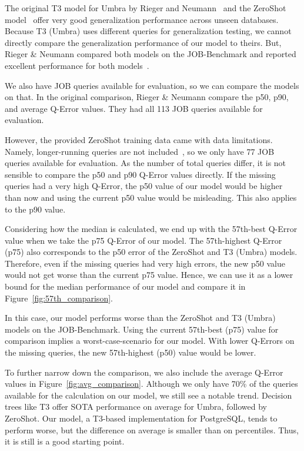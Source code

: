 The original T3 model for Umbra by Rieger and Neumann~\parencite{t3} and the ZeroShot model~\parencite{zeroshot} offer very good generalization performance across unseen databases.
Because T3 (Umbra) uses different queries for generalization testing, we cannot directly compare the generalization performance of our model to theirs.
But, Rieger \& Neumann compared both models on the JOB-Benchmark and reported excellent performance for both models~\parencite{t3}.

We also have JOB queries available for evaluation, so we can compare the models on that.
In the original comparison, Rieger \& Neumann compare the p50, p90, and average Q-Error values.
They had all 113 JOB queries available for evaluation. 

However, the provided ZeroShot training data came with data limitations.
Namely, longer-running queries are not included~\parencite{zeroshot}, so we only have 77 JOB queries available for evaluation.
As the number of total queries differ, it is not sensible to compare the p50 and p90 Q-Error values directly.
If the missing queries had a very high Q-Error, the p50 value of our model would be higher than now and using the current p50 value would be misleading.
This also applies to the p90 value.

Considering how the median is calculated, we end up with the 57th-best Q-Error value when we take the p75 Q-Error of our model.
The 57th-highest Q-Error (p75) also corresponds to the p50 error of the ZeroShot and T3 (Umbra) models.
Therefore, even if the missing queries had very high errors, the new p50 value would not get worse than the current p75 value.
Hence, we can use it as a lower bound for the median performance of our model and compare it in Figure~\ref{fig:57th_comparison}.

In this case, our model performs worse than the ZeroShot and T3 (Umbra) models on the JOB-Benchmark.
Using the current 57th-best (p75) value for comparison implies a worst-case-scenario for our model.
With lower Q-Errors on the missing queries, the new 57th-highest (p50) value would be lower.

To further narrow down the comparison, we also include the average Q-Error values in Figure~\ref{fig:avg_comparison}.
Although we only have 70\% of the queries available for the calculation on our model, we still see a notable trend. 
Decision trees like T3 offer SOTA performance on average for Umbra, followed by ZeroShot.
Our model, a T3-based implementation for PostgreSQL, tends to perform worse, but the difference on average is smaller than on percentiles.
Thus, it is still is a good starting point.

